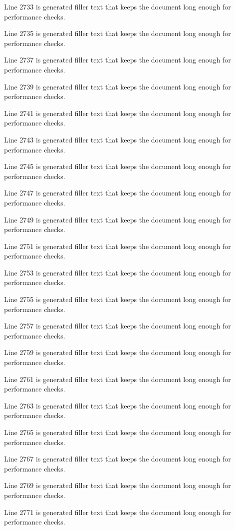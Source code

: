 Line 2733 is generated filler text that keeps the document long enough for performance checks.

Line 2735 is generated filler text that keeps the document long enough for performance checks.

Line 2737 is generated filler text that keeps the document long enough for performance checks.

Line 2739 is generated filler text that keeps the document long enough for performance checks.

Line 2741 is generated filler text that keeps the document long enough for performance checks.

Line 2743 is generated filler text that keeps the document long enough for performance checks.

Line 2745 is generated filler text that keeps the document long enough for performance checks.

Line 2747 is generated filler text that keeps the document long enough for performance checks.

Line 2749 is generated filler text that keeps the document long enough for performance checks.

Line 2751 is generated filler text that keeps the document long enough for performance checks.

Line 2753 is generated filler text that keeps the document long enough for performance checks.

Line 2755 is generated filler text that keeps the document long enough for performance checks.

Line 2757 is generated filler text that keeps the document long enough for performance checks.

Line 2759 is generated filler text that keeps the document long enough for performance checks.

Line 2761 is generated filler text that keeps the document long enough for performance checks.

Line 2763 is generated filler text that keeps the document long enough for performance checks.

Line 2765 is generated filler text that keeps the document long enough for performance checks.

Line 2767 is generated filler text that keeps the document long enough for performance checks.

Line 2769 is generated filler text that keeps the document long enough for performance checks.

Line 2771 is generated filler text that keeps the document long enough for performance checks.

